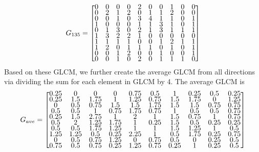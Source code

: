 \begin{align*}
G_{135} = 
\renewcommand{\arraystretch}{0.5}
\begin{bmatrix}
     0&     0&     0&     0 &    2 &    0 &    0 &    1  &   0  &   0\\
     0&     2&     1&     2 &    0 &    1 &    1 &    2  &   0  &   0\\
     0&     0&     1&     0 &    3 &    4 &    1 &    1  &   0  &   1\\
     1&     0&     0&     0 &    1 &    1 &    3 &    1  &   0  &   1\\
     0&     1&     3&     0 &    2 &    1 &    3 &    1  &   1  &   1\\
     1&     3&     2&     2 &    1 &    0 &    0 &    0  &   0  &   0\\
     1&     1&     1&     1 &    0 &    0 &    1 &    2  &   1  &   1\\
     1&     2&     0&     1 &    1 &    1 &    0 &    1  &   0  &   1\\
     0&     0&     1&     2 &    0 &    0 &    1 &    0  &   0  &   1\\
     0&     0&     1&     0 &    2 &    0 &    1 &    1  &   1  &   0
\end{bmatrix}
\end{align*}
Based on these GLCM, we further create the average GLCM from all directions via dividing the sum for each element in GLCM by 4. The average GLCM is 
\begin{align*}
G_{ave} = 
\renewcommand{\arraystretch}{0.5}
\begin{bmatrix}
0.25 &0 &0 &0 &0.75 &0.5 &1 &0.25 &0.5 &0.25\\
0.25 &1.5 &1.75 &1 &1.25 &0.75 &1.5 &1.75 &0 &1.25\\
0 &0.5 &0.75 &1.5 &1.5 &1.75 &1.5 &1.5 &0.75 &0.75\\
0.5 &0.5 &1 &0.75 &1.75 &0.75 &1 &0.5 &0.5 &0.75\\
0.25 &1.5 &2.75 &1 &2 &1 &1.5 &0.75 &1 &0.75\\
0.5 &2 &1.25 &1.75 &1 &0.25 &1.5 &0.5 &0.25 &0.25\\
0.5 &0.5 &1.75 &1.25 &1 &1 &1.5 &1.25 &1 &0.5\\
1.25 &1.25 &0.5 &0.25 &2.25 &1 &0.5 &1.75 &0.25 &0.75\\
0 &0.5 &0.75 &1.25 &0 &0.75 &0.5 &0 &0.25 &0.5\\
0.75 &0.5 &0.75 &0.25 &1.25 &0.75 &0.25 &1 &0.25 &0.5
\end{bmatrix}
\end{align*}
